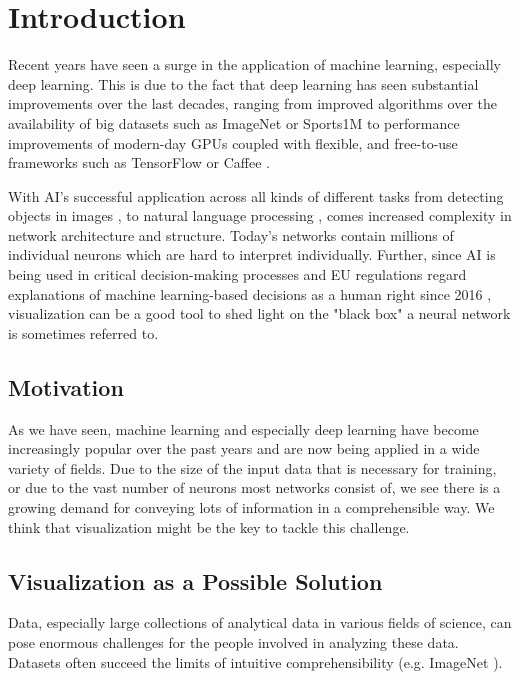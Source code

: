 \documentclass{acmsiggraph}               %
\begin{document}
\keywordlist

\section{Introduction}
Recent years have seen a surge in the application of machine learning, especially deep learning. This is due to the fact that deep learning has seen substantial improvements over the last decades, ranging from improved algorithms \cite{LeCun1998} over the availability of big datasets such as ImageNet \cite{Deng2009} or Sports1M \cite{Karpathy} to performance improvements of modern-day GPUs coupled with flexible, and free-to-use frameworks such as TensorFlow \cite{Abadi2016} or Caffee \cite{Jia2014}.

With AI's successful application across all kinds of different tasks from detecting objects in images \cite{He2015}, to natural language processing \cite{Cho}, comes increased complexity in network architecture and structure. Today's networks contain millions of individual neurons which are hard to interpret individually. Further, since AI is being used in critical decision-making processes and EU regulations regard explanations of machine learning-based decisions as a human right since 2016 \cite{Choo2018}, visualization can be a good tool to shed light on the "black box" a neural network is sometimes referred to. \cite{Shwartz-Ziv2017}


\copyrightspace

\subsection{Motivation}
As we have seen, machine learning and especially deep learning have become increasingly popular over the past years and are now being applied in a wide variety of fields. Due to the size of the input data that is necessary for training, or due to the vast number of neurons most networks consist of, we see there is a growing demand for conveying lots of information in a comprehensible way. We think that visualization might be the key to tackle this challenge.

\subsection{Visualization as a Possible Solution}
Data, especially large collections of analytical data in various fields of science, can pose enormous challenges for the people involved in analyzing these data. Datasets often succeed the limits of intuitive comprehensibility (e.g. ImageNet \cite{Deng2009}).
\end{document}
